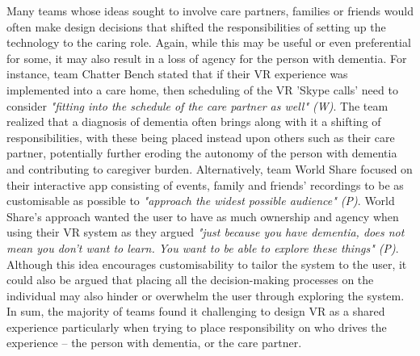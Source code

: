 Many teams whose ideas sought to involve care partners, families or friends would often make design decisions that shifted the responsibilities of setting up the technology to the caring role. Again, while this may be useful or even preferential for some, it may also result in a loss of agency for the person with dementia. For instance, team Chatter Bench stated that if their VR experience was implemented into a care home, then scheduling of the VR 'Skype calls' need to consider \textit{"fitting into the schedule of the care partner as well" (W)}. The team realized that a diagnosis of dementia often brings along with it a shifting of responsibilities, with these being placed instead upon others such as their care partner, potentially further eroding the autonomy of the person with dementia and contributing to caregiver burden. Alternatively, team World Share focused on their interactive app consisting of events, family and friends’ recordings to be as customisable as possible to \textit{"approach the widest possible audience" (P)}. World Share's approach wanted the user to have as much ownership and agency when using their VR system as they argued \textit{"just because you have dementia, does not mean you don't want to learn. You want to be able to explore these things" (P)}. Although this idea encourages customisability to tailor the system to the user, it could also be argued that placing all the decision-making processes on the individual may also hinder or overwhelm the user through exploring the system. In sum, the majority of teams found it challenging to design VR as a shared experience particularly when trying to place responsibility on who drives the experience – the person with dementia, or the care partner. 

